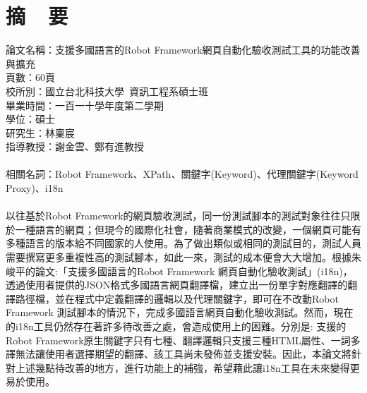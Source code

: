 \chapter*{摘~~要}


\noindent
論文名稱：支援多國語言的Robot Framework網頁自動化驗收測試工具的功能改善與擴充\\
頁數：60頁\\
校所別：國立台北科技大學~資訊工程系碩士班\\
畢業時間：一百一十學年度第二學期\\
學位：碩士\\
研究生：林稟宸\\
指導教授：謝金雲、鄭有進教授\\
\hspace*{\fill}\\
\noindent
相關名詞：Robot Framework、XPath、關鍵字(Keyword)、代理關鍵字(Keyword Proxy)、i18n\\
\hspace*{\fill}\\
%
\indent
以往基於Robot Framework的網頁驗收測試，同一份測試腳本的測試對象往往只限於一種語言的網頁；但現今的國際化社會，隨著商業模式的改變，一個網頁可能有多種語言的版本給不同國家的人使用。為了做出類似或相同的測試目的，測試人員需要撰寫更多重複性高的測試腳本，如此一來，測試的成本便會大大增加。根據朱峻平的論文:「支援多國語言的Robot Framework 網頁自動化驗收測試」(i18n)，透過使用者提供的JSON格式多國語言網頁翻譯檔，建立出一份單字對應翻譯的翻譯路徑檔，並在程式中定義翻譯的邏輯以及代理關鍵字，即可在不改動Robot Framework 測試腳本的情況下，完成多國語言網頁自動化驗收測試。然而，現在的i18n工具仍然存在著許多待改善之處，會造成使用上的困難。分別是: 支援的Robot Framework原生關鍵字只有七種、翻譯邏輯只支援三種HTML屬性、一詞多譯無法讓使用者選擇期望的翻譯、該工具尚未發佈並支援安裝。因此，本論文將針對上述幾點待改善的地方，進行功能上的補強，希望藉此讓i18n工具在未來變得更易於使用。
